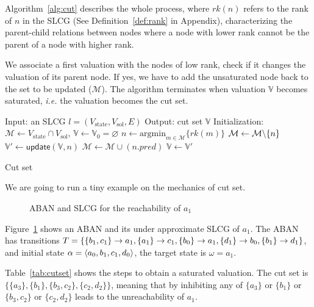Algorithm~\ref{alg:cut} describes the whole process, where $rk(n)$ refers to the rank of $n$ in the SLCG (See Definition~\ref{def:rank} in Appendix), characterizing the parent-child relations between nodes where a node with lower rank cannot be the parent of a node with higher rank.

We associate a first valuation with the nodes of low rank, check if it changes the valuation of its parent node.
If yes, we have to add the unsaturated node back to the set to be updated ($\mathcal{M}$).
The algorithm terminates when valuation $\mathbb{V}$ becomes saturated, \textit{i.e.} the valuation becomes the cut set.

\begin{algorithm}[ht]
\begin{algorithmic}
\State Input: an SLCG $l= (V_{\mathrm{state}},V_{\mathrm{sol}},E)$
\State Output: cut set $\mathbb{V}$
\State Initialization: $\mathcal{M}\gets V_{\mathrm{state}}\cap V_{\mathrm{sol}}$, $\mathbb{V}\gets\mathbb{V}_0=\varnothing$
        \State $n\gets\mathrm{argmin}_{m\in\mathcal{M}}\{rk(m)\}$
		\State $\mathcal{M}\gets\mathcal{M}\miset{n}$
		\State $\mathbb{V}'\gets\mathsf{update}(\mathbb{V},n)$
		    \State $\mathcal{M}\gets\mathcal{M}\cup(n.pred)$
		\EndIf
		\State $\mathbb{V}\gets\mathbb{V}'$
\EndWhile
\State {} 
\end{algorithmic}
\caption{Cut set}\label{alg:cut}
\end{algorithm}

We are going to run a tiny example on the mechanics of cut set.

\begin{figure}[ht]
\centering

\caption[Example of cut set]{ABAN and SLCG for the reachability of $a_1$}\label{fig:cut}
\end{figure}

\begin{example}\label{example:cutset}
Figure~\ref{fig:cut} shows an ABAN and its under approximate SLCG of $a_1$.
The ABAN has transitions $T=\{\{b_1,c_1\}\rightarrow a_1,\{a_1\}\rightarrow c_1,\{b_0\}\rightarrow a_1,\{d_1\}\rightarrow b_0,\{b_1\}\rightarrow d_1\}$, and initial state $\alpha= \langle a_0,b_1,c_1,d_0\rangle$, the target state is $\omega=a_1$.


Table~\ref{tab:cutset} shows the steps to obtain a saturated valuation.
The cut set is $\{\{a_3\},\{b_1\},\{b_3,c_2\},\{c_2,d_2\}\}$, meaning that by inhibiting any of $\{a_3\}$ or $\{b_1\}$ or $\{b_3,c_2\}$ or $\{c_2,d_2\}$ leads to the unreachability of $a_1$.

\end{example}

